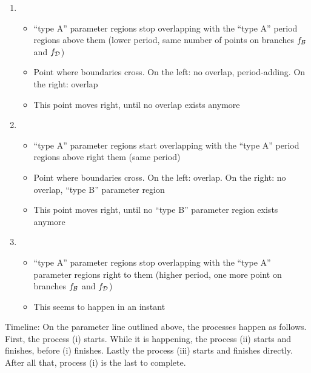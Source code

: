 \begin{enumerate}
    \item \begin{itemize}
              \item ``type A'' parameter regions stop overlapping with the ``type A'' period regions above them (lower period, same number of points on branches $f_{\mathcal{B}}$ and $f_{\mathcal{D}}$)
              \item Point where boundaries cross. On the left: no overlap, period-adding. On the right: overlap
              \item This point moves right, until no overlap exists anymore
          \end{itemize}
    \item \begin{itemize}
              \item ``type A'' parameter regions start overlapping with the ``type A'' period regions above right them (same period)
              \item Point where boundaries cross. On the left: overlap. On the right: no overlap, ``type B'' parameter region
              \item This point moves right, until no ``type B'' parameter region exists anymore
          \end{itemize}
    \item \begin{itemize}
              \item ``type A'' parameter regions stop overlapping with the ``type A'' parameter regions right to them (higher period, one more point on branches $f_{\mathcal{B}}$ and $f_{\mathcal{D}}$)
              \item This seems to happen in an instant
          \end{itemize}
\end{enumerate}

Timeline:
On the parameter line outlined above, the processes happen as follows.
First, the process (i) starts.
While it is happening, the process (ii) starts and finishes, before (i) finishes.
Lastly the process (iii) starts and finishes directly.
After all that, process (i) is the last to complete.




